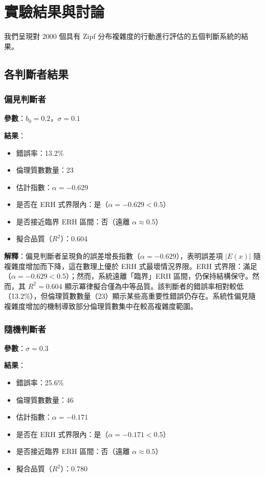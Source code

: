 \documentclass[12pt,a4paper]{article}
\theoremstyle{definition}
\theoremstyle{remark}
\begin{document}
\section{實驗結果與討論}
\label{sec:results}

我們呈現對 2000 個具有 Zipf 分布複雜度的行動進行評估的五個判斷系統的結果。

\subsection{各判斷者結果}

\subsubsection{偏見判斷者}

\textbf{參數}：$b_0 = 0.2$，$\sigma = 0.1$

\textbf{結果}：
\begin{itemize}
    \item 錯誤率：13.2\%
    \item 倫理質數數量：23
    \item 估計指數：$\alpha = -0.629$
    \item 是否在 ERH 式界限內：是（$\alpha = -0.629 < 0.5$）
    \item 是否接近臨界 ERH 區間：否（遠離 $\alpha \approx 0.5$）
    \item 擬合品質（$R^2$）：0.604
\end{itemize}

\textbf{解釋}：偏見判斷者呈現負的誤差增長指數（$\alpha = -0.629$），表明誤差項 $|E(x)|$ 隨複雜度增加而下降，這在數理上優於 ERH 式最壞情況界限。ERH 式界限：滿足（$\alpha = -0.629 < 0.5$）；然而，系統遠離「臨界」ERH 區間，仍保持結構保守。然而，其 $R^2 = 0.604$ 顯示冪律擬合僅為中等品質。該判斷者的錯誤率相對較低（13.2\%），但倫理質數數量（23）顯示某些高重要性錯誤仍存在。系統性偏見隨複雜度增加的機制導致部分倫理質數集中在較高複雜度範圍。

\subsubsection{隨機判斷者}

\textbf{參數}：$\sigma = 0.3$

\textbf{結果}：
\begin{itemize}
    \item 錯誤率：25.6\%
    \item 倫理質數數量：46
    \item 估計指數：$\alpha = -0.171$
    \item 是否在 ERH 式界限內：是（$\alpha = -0.171 < 0.5$）
    \item 是否接近臨界 ERH 區間：否（遠離 $\alpha \approx 0.5$）
    \item 擬合品質（$R^2$）：0.780
\end{itemize}
\end{document}
